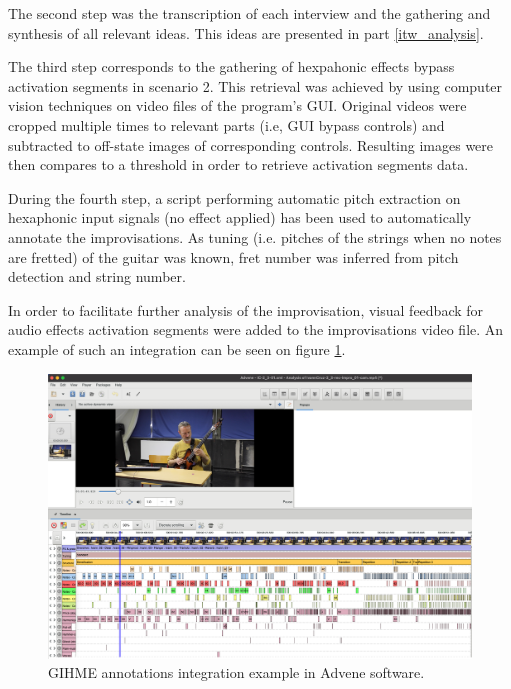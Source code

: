 \documentclass{article}
\begin{document}
The second step was the transcription of each interview and the gathering and synthesis of all relevant ideas. This ideas are presented in part \ref{itw_analysis}.

The third step corresponds to the gathering of hexpahonic effects bypass activation segments in scenario 2. This retrieval was achieved by using computer vision techniques on video files of the program's GUI. Original videos were cropped multiple times to relevant parts (i.e, GUI bypass controls) and subtracted to off-state images of corresponding controls. Resulting images were then compares to a threshold in order to retrieve activation segments data.

During the fourth step, a script performing automatic pitch extraction on hexaphonic input signals (no effect applied) has been used to automatically annotate the improvisations. As tuning (i.e. pitches of the strings when no notes are fretted) of the guitar was known, fret number was inferred from pitch detection and string number.  

In order to facilitate further analysis of the improvisation, visual feedback for audio effects activation segments were added to the improvisations video file. An example of such an integration can be seen on figure \ref{fig:Ivann-2_4-timeline}.

\begin{figure}
    \centering
    \includegraphics[width=\columnwidth]{figures/IvannCruz_2_3_1_Advene.png}
    \caption{GIHME annotations integration example in Advene software.}
    \label{fig:Ivann-2_4-timeline}
\end{figure}
\end{document}
